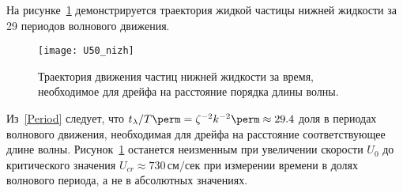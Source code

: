На рисунке~\ref{fig:Traj2} демонстрируется траектория жидкой частицы нижней жидкости за 29 периодов волнового движения. 
\begin{figure}[ht]
\centering
\texttt{[image: U50\_nizh]}
\caption{Траектория движения частиц нижней жидкости за время, необходимое для дрейфа на расстояние порядка длины волны.}\label{fig:Traj2}
\end{figure}
Из~\eqref{Period} следует, что $ t_{\lambda}/T\perm=\zeta^{-2}k^{-2}\perm\approx 29.4 $ доля в периодах волнового движения, необходимая для дрейфа на расстояние соответствующее длине волны. Рисунок~\ref{fig:Traj2} останется неизменным при увеличении скорости $ U_{0} $ до критического значения $ U_{cr}\approx 730\, \text{см/сек} $ при измерении времени в долях волнового периода, а не в абсолютных значениях.

